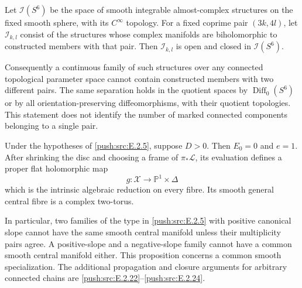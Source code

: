 \begin{corollary}\hypertarget{tag-033A}{}\label{push:src:E.2.24}


Let $\mathcal I(S^6)$ be the space of smooth integrable
almost-complex structures on the fixed smooth sphere,
with its $C^\infty$ topology.  For a fixed coprime pair
$(3k,4l)$, let $\mathcal I_{k,l}$ consist of the structures
whose complex manifolds are biholomorphic to constructed
members with that pair.  Then $\mathcal I_{k,l}$ is open
and closed in $\mathcal I(S^6)$.

Consequently a continuous family of such structures
over any connected topological parameter space cannot
contain constructed members with two different pairs.
The same separation holds in the quotient spaces by
$\operatorname{Diff}_0(S^6)$ or by all orientation-preserving
diffeomorphisms, with their quotient topologies.
This statement does not identify the number of marked
connected components belonging to a single pair.
\end{corollary}

\begin{proposition}\hypertarget{tag-033E}{}\label{push:src:E.2.6}


Under the hypotheses of \ref{push:src:E.2.5}, suppose $D>0$.  Then $E_0=0$
and $e=1$.  After shrinking the disc and choosing a frame of
$\pi_*\mathcal L$, its evaluation defines a proper flat
holomorphic map
\[
 g:\mathcal X\longrightarrow\mathbb P^1\times\Delta
\]
which is the intrinsic algebraic reduction on every fibre.
Its smooth general central fibre is a complex two-torus.

In particular, two families of the type in \ref{push:src:E.2.5} with positive
canonical slope cannot have the same smooth central manifold
unless their multiplicity pairs agree.  A positive-slope and
a negative-slope family cannot have a common smooth central
manifold either.  This proposition concerns a common smooth
specialization.  The additional propagation and closure
arguments for arbitrary connected chains are \ref{push:src:E.2.22}--\ref{push:src:E.2.24}.
\end{proposition}

